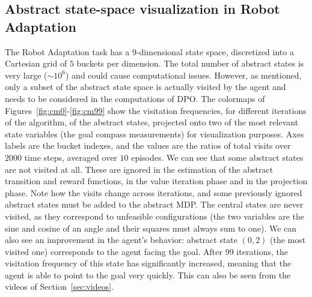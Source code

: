 \subsection{Abstract state-space visualization in Robot Adaptation}
The Robot Adaptation task has a $9$-dimensional state space, discretized into a Cartesian grid of $5$ buckets per dimension. The total number of abstract states is very large ($\sim 10^{6}$) and could cause computational issues. However, as mentioned, only a subset of the abstract state space is actually visited by the agent and needs to be considered in the computations of DPO. The colormaps of Figures~\ref{fig:cm0}-\ref{fig:cm99} show the visitation frequencies, for different iterations of the algorithm, of the abstract states, projected onto two of the most relevant state variables (the goal compass measurements) for visualization purposes. Axes labels are the bucket indexes, and the values are the ratios of total visits over $2000$ time steps, averaged over $10$ episodes. We can see that some abstract states are not visited at all. These are ignored in the estimation of the abstract transition and reward functions, in the value iteration phase and in the projection phase. Note how the visits change across iterations, and some previously ignored abstract states must be added to the abstract MDP. The central states are never visited, as they correspond to unfeasible configurations (the two variables are the sine and cosine of an angle and their squares must always sum to one). We can also see an improvement in the agent's behavior: abstract state $(0,2)$ (the most visited one) corresponds to the agent facing the goal. After $99$ iterations, the visitation frequency of this state has significantly increased, meaning that the agent is able to point to the goal very quickly. This can also be seen from the videos of Section~\ref{sec:videos}.


